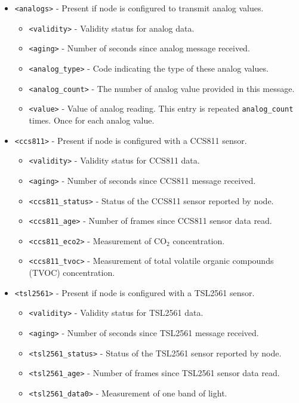 \documentclass[10pt, openany, draft]{article}
\begin{document}
\begin{itemize}
  \item \texttt{<analogs>} - Present if node is configured to transmit analog values.
  \begin{itemize}
    \item \texttt{<validity>} - Validity status for analog data.
    \item \texttt{<aging>} - Number of seconds since analog message received.
    \item \texttt{<analog\_type>} - Code indicating the type of these analog values.
    \item \texttt{<analog\_count>} - The number of analog value provided in this message.
    \item \texttt{<value>} - Value of analog reading.  This entry is repeated \texttt{analog\_count} times.  Once for each analog value.
  \end{itemize}
  \item \texttt{<ccs811>} - Present if node is configured with a CCS811 sensor.
  \begin{itemize}
    \item \texttt{<validity>} - Validity status for CCS811 data.
    \item \texttt{<aging>} - Number of seconds since CCS811 message received.
    \item \texttt{<ccs811\_status>} - Status of the CCS811 sensor reported by node.
    \item \texttt{<ccs811\_age>} - Number of frames since CCS811 sensor data read.
    \item \texttt{<ccs811\_eco2>} - Measurement of CO$_2$ concentration.
    \item \texttt{<ccs811\_tvoc>} - Measurement of total volatile organic compounds (TVOC) concentration.
  \end{itemize}
  \item \texttt{<tsl2561>} - Present if node is configured with a TSL2561 sensor.
  \begin{itemize}
    \item \texttt{<validity>} - Validity status for TSL2561 data.
    \item \texttt{<aging>} - Number of seconds since TSL2561 message received.
    \item \texttt{<tsl2561\_status>} - Status of the TSL2561 sensor reported by node.
    \item \texttt{<tsl2561\_age>} - Number of frames since TSL2561 sensor data read.
    \item \texttt{<tsl2561\_data0>} - Measurement of one band of light.

\end{itemize}
\end{itemize}
\end{document}
